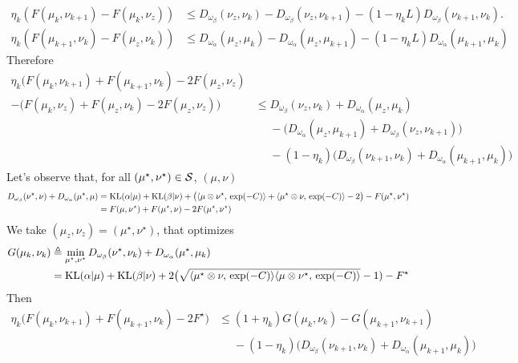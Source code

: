 \documentclass[a4paper, 10pt]{article}
\begin{document}
\begin{align}
    \eta_k (F(\mu_k,\nu_{k+1}) - F(\mu_k, \nu_z)) &\leq 
    D_{\omega_\beta}(\nu_z, \nu_k) - D_{\omega_\beta}(\nu_z, \nu_{k+1}) 
    - (1 - \eta_k L) D_{\omega_\beta}(\nu_{k+1}, \nu_k). \\
    \eta_k (F(\mu_{k+1},\nu_k) - F(\mu_z, \nu_k)) &\leq 
    D_{\omega_\alpha}(\mu_z, \mu_k) - D_{\omega_\alpha}(\mu_z, \mu_{k+1}) 
    - (1 - \eta_k L) D_{\omega_\alpha}(\mu_{k+1}, \mu_k)
\end{align}
Therefore
\begin{align}
    \eta_k \big(F(\mu_k,\nu_{k+1}) + F(\mu_{k+1},\nu_k) - 2 F(\mu_z, \nu_z) \\
     - ( F(\mu_k, \nu_z) + F(\mu_z, \nu_k) - 2 F(\mu_z, \nu_z)\big)
      &\leq 
    D_{\omega_\beta}(\nu_z, \nu_k) + D_{\omega_\alpha}(\mu_z, \mu_k) \\
    &\phantom{=}- \big(D_{\omega_\alpha}(\mu_z, \mu_{k+1})
     + D_{\omega_\beta}(\nu_z, \nu_{k+1})\big) \\
     &\phantom{=}
    - (1 - \eta_k) 
    \big(D_{\omega_\beta}(\nu_{k+1}, \nu_k) + D_{\omega_\alpha}(\mu_{k+1}, \mu_k)\big)
\end{align}
Let's observe that, for all $(\mu^\star, \nu^\star) \in \mathcal{S}$, $(\mu,\nu)$
\begin{align}
    D_{\omega_\beta}
    (\nu^\star, \nu) + D_{\omega_\alpha}(\mu^\star, \mu)
    &= \text{KL}(\alpha|\mu) + \text{KL}(\beta|\nu) 
    + \big(\langle \mu \otimes\nu^\star,\,\exp(-C)\rangle
     +\langle \mu^\star \otimes\nu,\,\exp(-C)\rangle - 2\big) - F(\mu^\star, \nu^\star) \\
     &= F(\mu, \nu^\star) + F(\mu^\star, \nu) - 2 F(\mu^\star, \nu^\star)
\end{align}
We take $(\mu_z,\nu_z) = (\mu^\star,\nu^\star)$, that optimizes
\begin{align}
    G(\mu_k, \nu_k) &\triangleq \min_{\mu^\star, \nu^\star} D_{\omega_\beta}
    (\nu^\star, \nu_k) + D_{\omega_\alpha}(\mu^\star, \mu_k) \\
    &= \text{KL}(\alpha|\mu) + \text{KL}(\beta|\nu) 
    + 2 \big( \sqrt{\langle \mu^\star \otimes \nu,\,\exp(-C)\rangle 
    \langle \mu \otimes \nu^\star,\,\exp(-C)\rangle} - 1) - 
    F^\star
\end{align}
Then
\begin{align}
    \eta_k \big(F(\mu_k,\nu_{k+1}) + F(\mu_{k+1},\nu_k) - 2 F^\star)
     &\leq 
    (1 + \eta_k) G(\mu_k, \nu_k) - G(\mu_{k+1}, \nu_{k+1}) \\
    &\phantom{=}
    - (1 - \eta_k) 
    \big(D_{\omega_\beta}(\nu_{k+1}, \nu_k) + D_{\omega_\alpha}(\mu_{k+1}, \mu_k)\big)    
\end{align}
\end{document}
